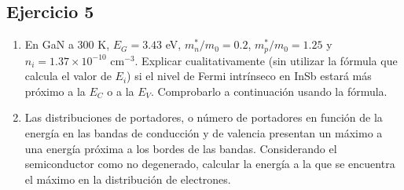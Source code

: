 \begin{Enunciado}
	
\subsection*{Ejercicio 5}

\begin{enumerate}[label=\alph*)]
	\item En GaN a 300 K, $E_G = 3.43$ eV, $m_n^*/m_0 = 0.2$, $m_p^*/m_0 = 1.25$ y $n_i = 1.37 \times 10^{-10} \text{ cm}^{-3}$. Explicar cualitativamente (sin utilizar la fórmula que calcula el valor de $E_i$) si el nivel de Fermi intrínseco en InSb estará más próximo a la $E_C$ o a la $E_V$. Comprobarlo a continuación usando la fórmula.

	\item Las distribuciones de portadores, o número de portadores en función de la energía en las bandas de conducción y de valencia presentan un máximo a una energía próxima a los bordes de las bandas. Considerando el semiconductor como no degenerado, calcular la energía a la que se encuentra el máximo en la distribución de electrones.
\end{enumerate}
\end{Enunciado}


